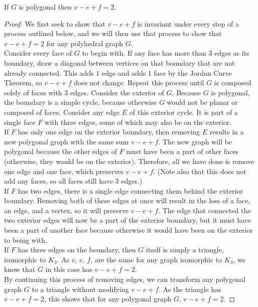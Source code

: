 \begin{theorem}[Euler]\label{thm:euler} If $G$ is polygonal then $v-e+f = 2$.
\end{theorem}
\begin{proof}
  We first seek to show that $v - e + f$ is invariant under every step of a process outlined below, and we will then use that process to show that $v - e + f = 2$ for any polyhedral graph $G$. \\
  Consider every face of $G$ to begin with. If any face has more than $3$ edges as its boundary, draw a diagonal between vertices on that boundary that are not already connected. This adds $1$ edge and adds $1$ face by the Jordan Curve Theorem, so $v - e + f$ does not change. Repeat this process until $G$ is composed solely of faces with $3$ edges. Consider the exterior of $G$. Because $G$ is polygonal, the boundary is a simple cycle, because otherwise $G$ would not be planar or composed of faces. Consider any edge $E$ of this exterior cycle. It is part of a single face $F$ with three edges, some of which may also be on the exterior. \\
  If $F$ has only one edge on the exterior boundary, then removing $E$ results in a new polygonal graph with the same sum $v - e + f$. The new graph will be polygonal because the other edges of $F$ must have been a part of other faces (otherwise, they would be on the exterior). Therefore, all we have done is remove one edge and one face, which preserves $v - e + f$. (Note also that this does not add any faces, so all faces still have $3$ edges.) \\
  If $F$ has two edges, there is a single edge connecting them behind the exterior boundary. Removing both of these edges at once will result in the loss of a face, an edge, and a vertex, so it will preserve $v - e + f$. The edge that connected the two exterior edges will now be a part of the exterior boundary, but it must have been a part of another face because otherwise it would have been on the exterior to being with. \\
  If $F$ has three edges on the boundary, then $G$ itself is simply a triangle, isomorphic to $K_3$. As $v$, $e$, $f$, are the same for any graph isomorphic to $K_3$, we know that $G$ in this case has $v - e + f = 2$. \\
  By continuing this process of removing edges, we can transform any polygonal graph $G$ to a triangle without modifying $v - e + f$. As the triangle has $v - e + f = 2$, this shows that for any polygonal graph $G$, $v - e + f = 2$.
  
\end{proof}

